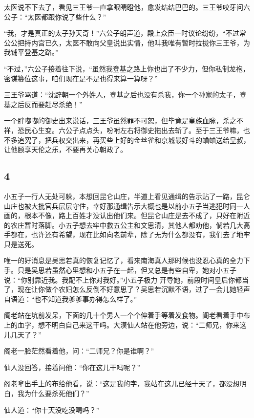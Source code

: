 太医说不下去了，看见三王爷一直拿眼睛瞪他，愈发结结巴巴的。三王爷咬牙问六公子：“太医都跟你说了些什么？”

“我，才是真正的太子孙天奇！”六公子朗声道，殿上众臣一时议论纷纷，“不过常公公把持内宫已久，太医不敢向父皇说出实情，他叫我唯有暂时拉拢你三王爷，为我铺平登基之路。”

“不过，”六公子接着往下说，“虽然我登基之路上你也出了不少力，但你私制龙袍，密谋篡位这事，咱们现在是不是也得来算一算呀？”

三王爷骂道：“沈辟朝一个外姓人，登基之后也没有杀我，你一个孙家的太子，登基之后反而要赶尽杀绝！”

一个胖嘟嘟的御史出来说话，三王爷虽然罪不可恕，但毕竟是皇族血脉，杀之不祥，恐民心生变。六公子点点头，吩咐左右将御史拖出去斩了。至于三王爷嘛，也不多追究了，把兵权交出来，再买些上好的金丝雀和京城最好斗的蛐蛐送给皇叔，让他颐享天伦之乐，不要再关心朝政了。
\newline

{\centering\subsection{4}}

小五子一行人无处可躲，本想回昆仑山庄，半道上看见通缉的告示贴了一路，昆仑山庄也被大批官兵层层守住，幸好那通缉告示大概也是以前小五子当逃犯时同一人画的，根本不像，路上百姓才没认出他们来。但昆仑山庄是去不成了，只好在附近的农庄暂时落脚。小五子想去牢中救五公主和文思清，其他人都劝他，倘若几大高手都在，也许还有希望，现在比如向老前辈，除了无为什么都没有，我们去了地牢只是送死。

唯一的好消息是吴思若真的恢复记忆了，看来南海真人那时候也没忍心真的全力下手。只是吴思若虽然心里想和小五子在一起，但又总是有些自卑，她对小五子说：“你别靠近我。我配不上你对我好。”小五子极力
开导她，前段时间皇后你都当了，现在让你做个农妇怎么反倒不好意思了？吴思若沉默不语，过了一会儿她轻声自语道：“也不知道我爹爹事办得怎么样了。”
\newline

阁老站在坑前发呆，下面的几十个男人一个个伸着手等着发食物。阁老看着手中布上的血字，想不明白自己来这干吗。大漠仙人站在他旁边，说：“二师兄，你来这儿几天了？”

阁老一脸茫然看着他，问：“二师兄？你是谁啊？”

仙人没回答，接着问他：“你在这儿干吗呢？”

阁老拿出手上的布给他看，说：“这是我的字，我站在这儿已经十天了，都没想明白，我为什么要杀死他们？”

仙人道：“你十天没吃没喝吗？”

